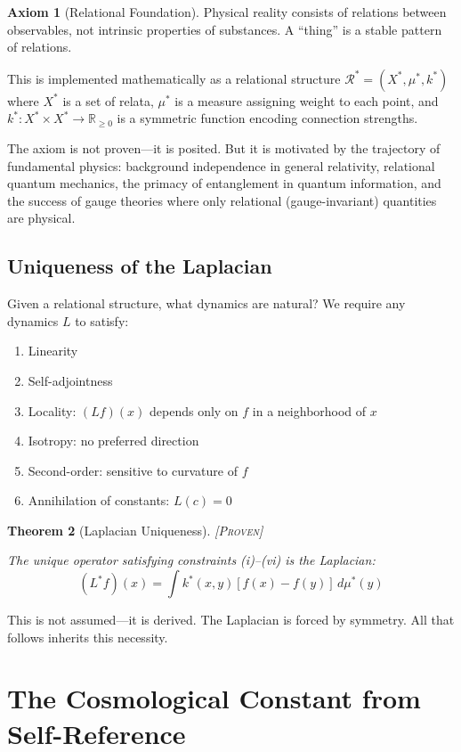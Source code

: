 \documentclass[11pt,a4paper]{article}
\newtheorem{theorem}{Theorem}[section]
\theoremstyle{definition}
\newtheorem{axiom}[theorem]{Axiom}
\theoremstyle{remark}
\begin{document}
\begin{axiom}[Relational Foundation]
Physical reality consists of relations between observables, not intrinsic properties of substances. A ``thing'' is a stable pattern of relations.
\end{axiom}

This is implemented mathematically as a relational structure $\mathcal{R}^* = (X^*, \mu^*, k^*)$ where $X^*$ is a set of relata, $\mu^*$ is a measure assigning weight to each point, and $k^*: X^* \times X^* \to \mathbb{R}_{\geq 0}$ is a symmetric function encoding connection strengths.

The axiom is not proven---it is posited. But it is motivated by the trajectory of fundamental physics: background independence in general relativity, relational quantum mechanics, the primacy of entanglement in quantum information, and the success of gauge theories where only relational (gauge-invariant) quantities are physical.

\subsection{Uniqueness of the Laplacian}

Given a relational structure, what dynamics are natural? We require any dynamics $L$ to satisfy:
\begin{enumerate}
    \item[(i)] Linearity
    \item[(ii)] Self-adjointness
    \item[(iii)] Locality: $(Lf)(x)$ depends only on $f$ in a neighborhood of $x$
    \item[(iv)] Isotropy: no preferred direction
    \item[(v)] Second-order: sensitive to curvature of $f$
    \item[(vi)] Annihilation of constants: $L(c) = 0$
\end{enumerate}

\begin{theorem}[Laplacian Uniqueness]
\textsc{[Proven]}

The unique operator satisfying constraints (i)--(vi) is the Laplacian:
\[
(L^* f)(x) = \int k^*(x,y)[f(x) - f(y)] \, d\mu^*(y)
\]
\end{theorem}

This is not assumed---it is derived. The Laplacian is forced by symmetry. All that follows inherits this necessity.

\section{The Cosmological Constant from Self-Reference}
\end{document}
